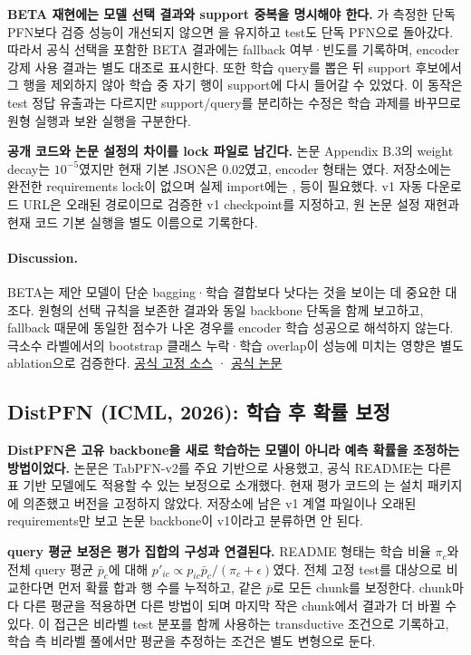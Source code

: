 \textbf{BETA 재현에는 모델 선택 결과와 support 중복을 명시해야 한다.} 가 측정한 단독 PFN보다 검증 성능이 개선되지 않으면 을 유지하고 test도 단독 PFN으로 돌아갔다. 따라서 공식 선택을 포함한 BETA 결과에는 fallback 여부·빈도를 기록하며, encoder 강제 사용 결과는 별도 대조로 표시한다. 또한 학습 query를 뽑은 뒤 support 후보에서 그 행을 제외하지 않아 학습 중 자기 행이 support에 다시 들어갈 수 있었다. 이 동작은 test 정답 유출과는 다르지만 support/query를 분리하는 수정은 학습 과제를 바꾸므로 원형 실행과 보완 실행을 구분한다.

\textbf{공개 코드와 논문 설정의 차이를 lock 파일로 남긴다.} 논문 Appendix B.3의 weight decay는 $10^{-5}$였지만 현재 기본 JSON은 0.02였고, encoder 형태는 였다. 저장소에는 완전한 requirements lock이 없으며 실제 import에는 ,  등이 필요했다. v1 자동 다운로드 URL은 오래된 경로이므로 검증한 v1 checkpoint를 지정하고, 원 논문 설정 재현과 현재 코드 기본 실행을 별도 이름으로 기록한다.

\paragraph{Discussion.}
BETA는 제안 모델이 단순 bagging·학습 결합보다 낫다는 것을 보이는 데 중요한 대조다. 원형의 선택 규칙을 보존한 결과와 동일 backbone 단독을 함께 보고하고, fallback 때문에 동일한 점수가 나온 경우를 encoder 학습 성공으로 해석하지 않는다. 극소수 라벨에서의 bootstrap 클래스 누락·학습 overlap이 성능에 미치는 영향은 별도 ablation으로 검증한다.
\href{https://github.com/LAMDA-Tabular/BETA/tree/441e3741b58915e69024a97e372575701a9f86a3}{공식 고정 소스} · \href{https://proceedings.mlr.press/v267/liu25cn.html}{공식 논문}

\subsection{DistPFN (ICML, 2026): 학습 후 확률 보정}
\textbf{DistPFN은 고유 backbone을 새로 학습하는 모델이 아니라 예측 확률을 조정하는 방법이었다.} 논문은 TabPFN-v2를 주요 기반으로 사용했고, 공식 README는 다른 표 기반 모델에도 적용할 수 있는 보정으로 소개했다. 현재 평가 코드의 는 설치 패키지에 의존했고 버전을 고정하지 않았다. 저장소에 남은 v1 계열 파일이나 오래된 requirements만 보고 논문 backbone이 v1이라고 분류하면 안 된다.

\textbf{query 평균 보정은 평가 집합의 구성과 연결된다.} README 형태는 학습 비율 $\pi_c$와 전체 query 평균 $\bar p_c$에 대해 $p'_{ic}\propto p_{ic}\bar p_c/(\pi_c+\epsilon)$였다. 전체 고정 test를 대상으로 비교한다면 먼저 확률 합과 행 수를 누적하고, 같은 $\bar p$로 모든 chunk를 보정한다. chunk마다 다른 평균을 적용하면 다른 방법이 되며 마지막 작은 chunk에서 결과가 더 바뀔 수 있다. 이 접근은 비라벨 test 분포를 함께 사용하는 transductive 조건으로 기록하고, 학습 측 비라벨 풀에서만 평균을 추정하는 조건은 별도 변형으로 둔다.

